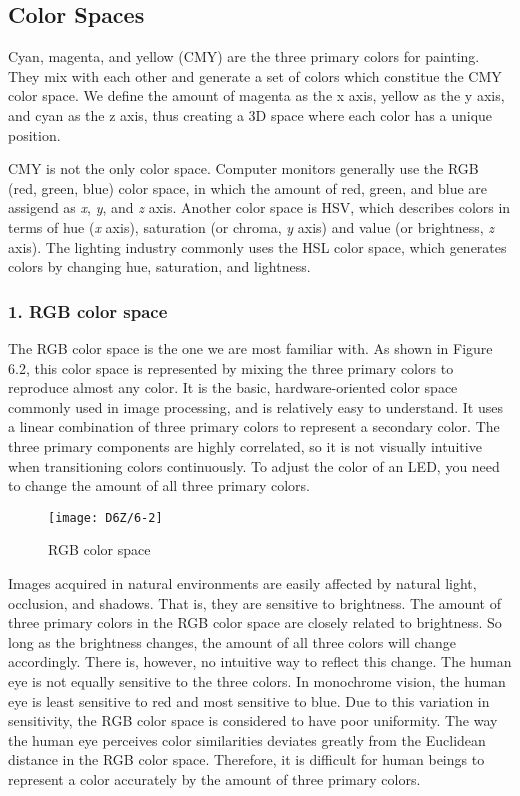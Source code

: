 \documentclass[a4paper,12pt]{book}
\begin{document}
\subsection{Color Spaces}
Cyan, magenta, and yellow (CMY) are the three primary colors for painting. They mix with each other and generate a set of colors which constitue the CMY color space. We define the amount of magenta as the x axis, yellow as the y axis, and cyan as the z axis, thus creating a 3D space where each color has a unique position.

CMY is not the only color space. Computer monitors generally use the RGB (red, green, blue) color space, in which the amount of red, green, and blue are assigend as \textit{x}, \textit{y}, and \textit{z} axis. Another color space is HSV, which describes colors in terms of hue (\textit{x} axis), saturation (or chroma, \textit{y} axis) and value (or brightness, \textit{z} axis). The lighting industry commonly uses the HSL color space, which generates colors by changing hue, saturation, and lightness.

\subsubsection{1. RGB color space}
The RGB color space is the one we are most familiar with. As shown in Figure 6.2, this color space is represented by mixing the three primary colors to reproduce almost any color. It is the basic, hardware-oriented color space commonly used in image processing, and is relatively easy to understand. It uses a linear combination of three primary colors to represent a secondary color. The three primary components are highly correlated, so it is not visually intuitive when transitioning colors continuously. To adjust the color of an LED, you need to change the amount of all three primary colors.

\begin{figure}[h!]
    \centering
    \texttt{[image: D6Z/6-2]}
    \caption{RGB color space}
\end{figure}

Images acquired in natural environments are easily affected by natural light, occlusion, and shadows. That is, they are sensitive to brightness. The amount of three primary colors in the RGB color space are closely related to brightness. So long as the brightness changes, the amount of all three colors will change accordingly. There is, however, no intuitive way to reflect this change. The human eye is not equally sensitive to the three colors. In monochrome vision, the human eye is least sensitive to red and most sensitive to blue. Due to this variation in sensitivity, the RGB color space is considered to have poor uniformity. The way the human eye perceives color similarities deviates greatly from the Euclidean distance in the RGB color space. Therefore, it is difficult for human beings to represent a color accurately by the amount of three primary colors.
\end{document}
